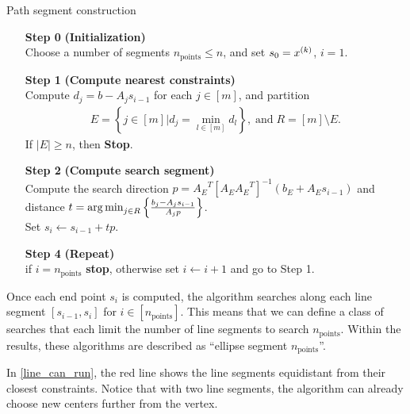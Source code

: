 \begin{algorithm}[H]
    \caption{Path segment construction}
    \label{segment_construction}
    \begin{itemize}
        \item[\textbf{Step 0}] \textbf{(Initialization)} \\
            Choose a number of segments $n_{\text{points}} \le n$, and set $s_0 = x^{(k)}$, $i=1$.
            
        \item[\textbf{Step 1}] \textbf{(Compute nearest constraints)} \\
			Compute $d_j = b - A_j s_{i-1}$ for each $j \in [m]$, and partition 
			\begin{align*}
			E = \left\{j \in [m] \bigg| d_j = \min_{l \in [m]} d_l\right\}, \; \textrm{and} \; R = [m] \setminus E.
			\end{align*}
			If $|E| \ge n$, then \textbf{Stop}.
			
            
        \item[\textbf{Step 2}] \textbf{(Compute search segment)} \\
        	Compute the search direction $p = {A_E}^T\left[A_E{A_E}^T\right]^{-1}\left(b_E + A_E s_{i-1}\right)$
        	and distance $t = \operatorname*{arg\,min}_{j \in R} \left\{\frac{b_j - A_j s_{i-1}}{A_jp}  \right\}$. \\
        	Set $s_i \gets s_{i-1} + tp$.
        	
        \item[\textbf{Step 4}] \textbf{(Repeat)} \\
        if $i = n_{\text{points}}$ \textbf{stop}, otherwise set $i \gets i+1$ and go to Step 1.
    \end{itemize}
\end{algorithm}



Once each end point $s_i$ is computed, the algorithm searches along each line segment $[s_{i-1}, s_i]$ for $i \in [n_{\text{points}}]$.
This means that we can define a class of searches that each limit the number of line segments to search $n_{\text{points}}$.
Within the results, these algorithms are described as ``ellipse segment $n_{\text{points}}$''.

In \cref{line_can_run}, the red line shows the line segments equidistant from their closest constraints.
Notice that with two line segments, the algorithm can already choose new centers further from the vertex.

